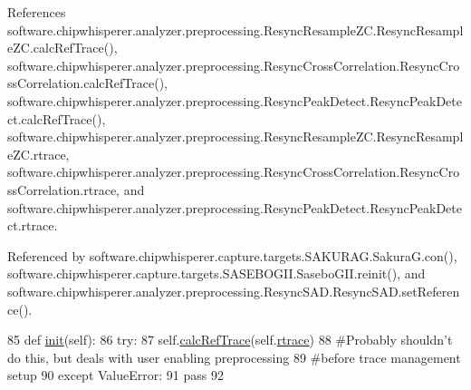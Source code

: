 References software.\+chipwhisperer.\+analyzer.\+preprocessing.\+Resync\+Resample\+Z\+C.\+Resync\+Resample\+Z\+C.\+calc\+Ref\+Trace(), software.\+chipwhisperer.\+analyzer.\+preprocessing.\+Resync\+Cross\+Correlation.\+Resync\+Cross\+Correlation.\+calc\+Ref\+Trace(), software.\+chipwhisperer.\+analyzer.\+preprocessing.\+Resync\+Peak\+Detect.\+Resync\+Peak\+Detect.\+calc\+Ref\+Trace(), software.\+chipwhisperer.\+analyzer.\+preprocessing.\+Resync\+Resample\+Z\+C.\+Resync\+Resample\+Z\+C.\+rtrace, software.\+chipwhisperer.\+analyzer.\+preprocessing.\+Resync\+Cross\+Correlation.\+Resync\+Cross\+Correlation.\+rtrace, and software.\+chipwhisperer.\+analyzer.\+preprocessing.\+Resync\+Peak\+Detect.\+Resync\+Peak\+Detect.\+rtrace.



Referenced by software.\+chipwhisperer.\+capture.\+targets.\+S\+A\+K\+U\+R\+A\+G.\+Sakura\+G.\+con(), software.\+chipwhisperer.\+capture.\+targets.\+S\+A\+S\+E\+B\+O\+G\+I\+I.\+Sasebo\+G\+I\+I.\+reinit(), and software.\+chipwhisperer.\+analyzer.\+preprocessing.\+Resync\+S\+A\+D.\+Resync\+S\+A\+D.\+set\+Reference().


\begin{DoxyCode}
85     \textcolor{keyword}{def }\hyperlink{classsoftware_1_1chipwhisperer_1_1analyzer_1_1preprocessing_1_1ResyncResampleZC_1_1ResyncResampleZC_a651f9d9c785c8bbb34cef45402d41f0a}{init}(self):
86         \textcolor{keywordflow}{try}:
87             self.\hyperlink{classsoftware_1_1chipwhisperer_1_1analyzer_1_1preprocessing_1_1ResyncResampleZC_1_1ResyncResampleZC_a3123e88a94f0fe4373e06e53910850e8}{calcRefTrace}(self.\hyperlink{classsoftware_1_1chipwhisperer_1_1analyzer_1_1preprocessing_1_1ResyncResampleZC_1_1ResyncResampleZC_aff2f7326db7dd0e654700cbcb8b9e754}{rtrace})
88         \textcolor{comment}{#Probably shouldn't do this, but deals with user enabling preprocessing}
89         \textcolor{comment}{#before trace management setup}
90         \textcolor{keywordflow}{except} ValueError:
91             \textcolor{keywordflow}{pass}
92 
\end{DoxyCode}
\hypertarget{classsoftware_1_1chipwhisperer_1_1analyzer_1_1preprocessing_1_1ResyncResampleZC_1_1ResyncResampleZC_afa24d2ce13dcaccae2612592d6484622}{}
